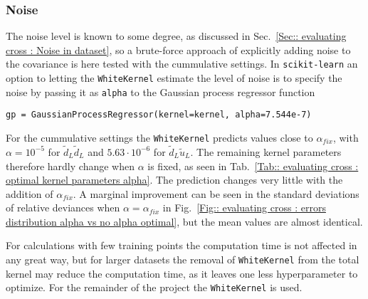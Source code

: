\documentclass[twoside,english]{uiofysmaster}
\begin{document}
\subsubsection{Noise}

The noise level is known to some degree, as discussed in Sec.~\ref{Sec:: evaluating cross : Noise in dataset}, so a brute-force approach of explicitly adding noise to the covariance is here tested with the cummulative settings. In \verb|scikit-learn| an option to letting the \verb|WhiteKernel| estimate the level of noise is to specify the noise by passing it as \verb|alpha| to the Gaussian process regressor function
\begin{lstlisting}
gp = GaussianProcessRegressor(kernel=kernel, alpha=7.544e-7)
\end{lstlisting}


For the cummulative settings the \verb|WhiteKernel| predicts values close to $\alpha_{fix}$, with $\alpha=10^{-5}$ for $\tilde{d}_L \tilde{d}_L$ and $5.63 \cdot 10^{-6}$ for $\tilde{d}_L \tilde{u}_L$. The remaining kernel parameters therefore hardly change when $\alpha$ is fixed, as seen in Tab.~\ref{Tab:: evaluating cross : optimal kernel parameters alpha}. The prediction changes very little with the addition of $\alpha_{fix}$. A marginal improvement can be seen in the standard deviations of relative deviances when $\alpha = \alpha_{fix}$ in Fig.~\ref{Fig:: evaluating cross : errors distribution alpha vs no alpha optimal}, but the mean values are almost identical.

For calculations with few training points the computation time is not affected in any great way, but for larger datasets the removal of \verb|WhiteKernel| from the total kernel may reduce the computation time, as it leaves one less hyperparameter to optimize. For the remainder of the project the \verb|WhiteKernel| is used.



  
\end{document}
